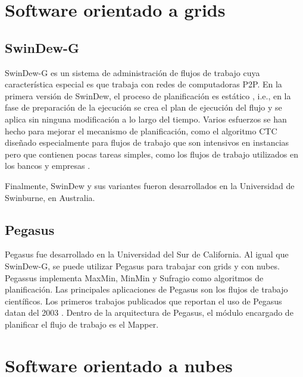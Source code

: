 \section{Software orientado a grids}

\subsection{SwinDew-G}


SwinDew-G \cite{yang2007peer} es un sistema de administración de flujos de trabajo cuya característica especial es que trabaja con redes de computadoras P2P. En la primera versión de SwinDew, el proceso de planificación es estático \cite{yang2007peer}, i.e., en la fase de preparación de la ejecución se crea el plan de ejecución del flujo y se aplica sin ninguna modificación a lo largo del tiempo. Varios esfuerzos se han hecho para mejorar el mecanismo de planificación, como el algoritmo CTC \cite{liu2010compromised} diseñado especialmente para flujos de trabajo que son intensivos en instancias pero que contienen pocas tareas simples, como los flujos de trabajo utilizados en los bancos y empresas \cite{liu2011novel}.

Finalmente, SwinDew y sus variantes fueron desarrollados en la Universidad de Swinburne, en Australia.

\subsection{Pegasus}

Pegasus \cite{deelman2005pegasus} fue desarrollado en la Universidad del Sur de California. Al igual que SwinDew-G, se puede utilizar Pegasus para trabajar con grids y con nubes. Pegassus implementa MaxMin, MinMin y Sufragio como algoritmos de planificación. Las principales aplicaciones de Pegasus son los flujos de trabajo científicos. Los primeros trabajos publicados que reportan el uso de Pegasus datan del 2003 \cite{pegasus2014publications}. Dentro de la arquitectura de Pegasus, el módulo encargado de planificar el flujo de trabajo es el Mapper.

\section{Software orientado a nubes}

